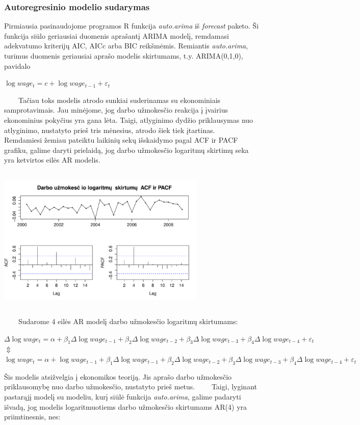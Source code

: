 \documentclass[12pt,a4paper]{article}
\theoremstyle{change}\newtheorem{salyga}{Uždavinys}
\begin{document}
\subsubsection{Autoregresinio modelio sudarymas}
\hspace{40pt}Pirmiausia pasinaudojome programos R funkcija \textit{auto.arima} iš \textit{forecast }paketo. Ši funkcija siūlo geriausiai duomenis aprašantį ARIMA modelį, remdamasi adekvatumo kriterijų AIC, AICc arba BIC reikšmėmis. Remiantis \textit{auto.arima}, turimus duomenis geriausiai aprašo modelis skirtumams, t.y. ARIMA(0,1,0), pavidalo
\begin{center}
\large $  \log wage_t=c+\log wage_{t-1}+\varepsilon_t$
\end{center}
\vskip 8pt
$\qquad$Tačiau toks modelis atrodo sunkiai suderinamas su ekonominiais samprotavimais. Jau minėjome, jog darbo užmokesčio reakcija į įvairius ekonominius pokyčius yra gana lėta. Taigi, atlyginimo dydžio priklausymas nuo atlyginimo, nustatyto prieš tris mėnesius, atrodo šiek tiek įtartinas.
\vskip 8pt
$\qquad$Remdamiesi žemiau pateiktu laikinių sekų išskaidymo pagal ACF ir PACF grafiku, galime daryti prielaidą, jog darbo užmokesčio logaritmų skirtimų seka yra ketvirtos eilės AR modelis. 
\vskip 8pt

\begin{center}
\includegraphics[width=100mm,height=70mm]{pacf}
\end{center}
\vskip 8pt
$\qquad$Sudarome 4 eilės AR modelį darbo užmokesčio logaritmų skirtumams:

\begin{center}
\large$ \Delta\log wage_t=\alpha+\beta_1\Delta\log wage_{t-1}+\beta_2\Delta\log wage_{t-2}+\beta_3\Delta\log wage_{t-3}+\beta_4\Delta\log wage_{t-4} +\varepsilon_t$ 
\large\\ $ \Updownarrow $
\large\\$ \log wage_t=\alpha+\log wage_{t-1}+\beta_1\Delta\log wage_{t-1}+\beta_2\Delta\log wage_{t-2}+\beta_3\Delta\log wage_{t-3}+\beta_4\Delta\log wage_{t-4}+\varepsilon_t $ 
\end{center}
Šis modelis atsižvelgia į ekonomikos teoriją. Jis aprašo darbo užmokesčio priklausomybę nuo darbo užmokesčio, nustatyto prieš metus. 
\vskip 8pt
$\qquad$Taigi, lyginant pastarąjį modelį su modeliu, kurį siūlė funkcija \textit{auto.arima}, galime padaryti išvadą, jog modelis logaritmuotiems darbo užmokesčio skirtumams AR(4) yra priimtinesnis, nes:
\end{document}
